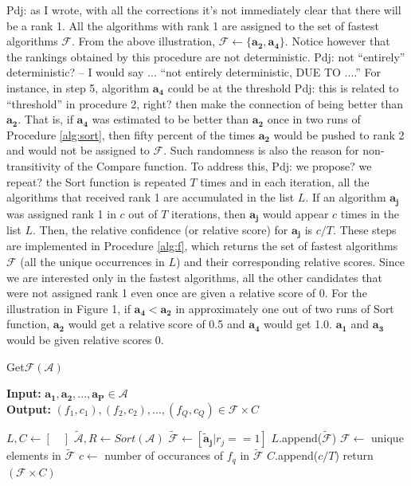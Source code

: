 \documentclass[conference]{IEEEtran}
\newcommand{\p}[1]{{\color{blue} Pdj: #1}}
\begin{document}
\p{as I wrote, with all the corrections it's not immediately clear that there will be a rank 1.}
All the algorithms with rank 1 are assigned to the set of fastest algorithms $\mathcal{F}$. From the above illustration,
$\mathcal{F} \leftarrow \{\mathbf{a_2}, \mathbf{a_4}\}$. Notice however that the rankings obtained by this procedure are
not deterministic. \p{not ``entirely'' deterministic? -- I would say ... ``not entirely deterministic, DUE TO ....''}
For instance, in step 5, algorithm $\mathbf{a_4}$ could be at the threshold \p{this is related to ``threshold'' in
  procedure 2, right? then make the connection} of being better than $\mathbf{a_2}$. That is, if $\mathbf{a_4}$ was
estimated to be better than $\mathbf{a_2}$ once in two runs of Procedure \ref{alg:sort}, then fifty percent of the times
$\mathbf{a_2}$ would be pushed to rank 2 and would not be assigned to $\mathcal{F}$. Such randomness is also the reason
for non-transitivity of the Compare function. To address this, \p{we propose? we repeat?} the Sort function is repeated
$T$ times and in each iteration, all the algorithms that received rank 1 are accumulated in the list $L$. If an
algorithm $\mathbf{a_j}$ was assigned rank 1 in $c$ out of $T$ iterations, then $\mathbf{a_j}$ would appear $c$ times in
the list $L$. Then, the relative confidence (or relative score) for $\mathbf{a_j}$ is $c/T$. These steps are implemented
in Procedure \ref{alg:f}, which returns the set of fastest algorithms $\mathcal{F}$ (all the unique occurrences in $L$)
and their corresponding relative scores. Since we are interested only in the fastest algorithms, all the other
candidates that were not assigned rank 1 even once are given a relative score of 0. For the illustration in Figure 1, if $\mathbf{a_4} < \mathbf{a_2}$ in approximately one out of two runs of Sort function, $\mathbf{a_2}$ would get a relative score of 0.5 and $\mathbf{a_4}$ would get 1.0.  $\mathbf{a_1}$ and $\mathbf{a_3}$ would be given relative scores 0.


\begin{algorithm}
	\caption{ Get$\mathcal{F}$$(\mathcal{A})$ }
	\label{alg:f}
	\hspace*{\algorithmicindent} \textbf{Input: } $ \mathbf{a_1},\mathbf{a_2} ,..., \mathbf{a_P}\in \mathcal{A}$ \\
	\hspace*{\algorithmicindent} \textbf{Output: } $ (f_1,c_1), (f_2, c_2), ..., (f_Q,c_Q) \in \mathcal{F} \times C  $
	\begin{algorithmic}[1] 
		\State $L, C \leftarrow [ \quad ]$ 
		\State $\tilde{\mathcal{A}}, R \leftarrow Sort(\mathcal{A})$
		\State $\tilde{\mathcal{F}} \leftarrow [\mathbf{\tilde{a}_j} | r_j == 1 ]$ 
		\State $L$.append($\tilde{\mathcal{F}}$)
		\EndFor
		\State $\mathcal{F} \leftarrow $ unique elements in $\tilde{\mathcal{F}}$ 
		\State $c \leftarrow$ number of occurances of $f_q$ in $\tilde{\mathcal{F}}$ 
		\State $C$.append($c/T$)
		\EndFor
		\State return $(\mathcal{F} \times C)$
	\end{algorithmic}
\end{algorithm}
\end{document}
